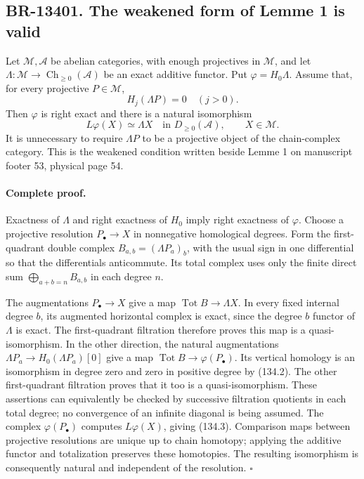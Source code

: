 \subsection{BR-13401. The weakened form of Lemme 1 is valid}
Let \(\mathcal M,\mathcal A\) be abelian categories, with enough
projectives in \(\mathcal M\), and let
\(\Lambda:\mathcal M\to\operatorname{Ch}_{\geq0}(\mathcal A)\)
be an exact additive functor.  Put \(\varphi=H_0\Lambda\).
Assume that, for every projective \(P\in\mathcal M\),
\[
 H_j(\Lambda P)=0\quad(j>0).
 \tag{134.2}
\]
Then \(\varphi\) is right exact and there is a natural isomorphism
\[
 L\varphi(X)\simeq\Lambda X
 \quad\text{in }D_{\geq0}(\mathcal A),\qquad X\in\mathcal M.
 \tag{134.3}
\]
It is unnecessary to require \(\Lambda P\) to be a projective object
of the chain-complex category.  This is the weakened condition written
beside Lemme 1 on manuscript footer 53, physical page 54.

\paragraph{Complete proof.}
Exactness of \(\Lambda\) and right exactness of \(H_0\) imply right
exactness of \(\varphi\).  Choose a projective resolution
\(P_\bullet\to X\) in nonnegative homological degrees.  Form the
first-quadrant double complex
\(B_{a,b}=(\Lambda P_a)_b\), with the usual sign in one
differential so that the differentials anticommute.  Its total complex
uses only the finite direct sum \(\bigoplus_{a+b=n}B_{a,b}\) in each
degree \(n\).

The augmentations \(P_\bullet\to X\) give a map
\(\operatorname{Tot}B\to\Lambda X\).  In every fixed internal degree
\(b\), its augmented horizontal complex is exact, since the degree
\(b\) functor of \(\Lambda\) is exact.  The first-quadrant filtration
therefore proves this map is a quasi-isomorphism.  In the other
direction, the natural augmentations
\(\Lambda P_a\to H_0(\Lambda P_a)[0]\) give a map
\(\operatorname{Tot}B\to\varphi(P_\bullet)\).  Its vertical homology
is an isomorphism in degree zero and zero in positive degree by
(134.2).  The other first-quadrant filtration proves that it too is a
quasi-isomorphism.  These assertions can equivalently be checked by
successive filtration quotients in each total degree; no convergence
of an infinite diagonal is being assumed.  The complex
\(\varphi(P_\bullet)\) computes \(L\varphi(X)\), giving (134.3).
Comparison maps between projective resolutions are unique up to chain
homotopy; applying the additive functor and totalization preserves
these homotopies.  The resulting isomorphism is consequently natural
and independent of the resolution. \(\square\)

